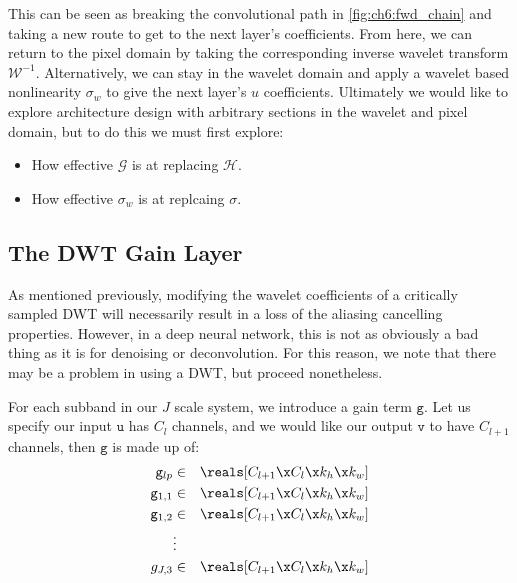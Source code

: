 This can be seen as breaking the convolutional path in
\autoref{fig:ch6:fwd_chain} and taking a new route to get to the next layer's
coefficients. From here, we can return to the pixel domain by taking the
corresponding inverse wavelet transform $\mathcal{W}^{-1}$. Alternatively, we
can stay in the wavelet domain and apply a wavelet based nonlinearity $\sigma_w$
to give the next layer's $u$ coefficients. Ultimately we would like to explore
architecture design with arbitrary sections in the wavelet and pixel domain, but
to do this we must first explore: 
\begin{itemize}
  \item How effective $\mathcal{G}$ is at replacing $\mathcal{H}$.
  \item How effective $\sigma_w$ is at replcaing $\sigma$.
\end{itemize}





\subsection{The DWT Gain Layer}
As mentioned previously, modifying the wavelet coefficients of a critically
sampled DWT will necessarily result in a loss of the aliasing cancelling
properties. However, in a deep neural network, this is not as obviously a bad
thing as it is for denoising or deconvolution. For this reason, we note that
there may be a problem in using a DWT, but proceed nonetheless.

For each subband in our $J$ scale system, we introduce a gain term $\mathtt{g}$. Let us specify our
input $\mathtt{u}$ has $C_l$ channels, and we would like our output $\mathtt{v}$
to have $C_{l+1}$ channels, then $\mathtt{g}$ is made up of:
\begin{eqnarray}
  \mathtt{g}_{lp} &\in& \reals[C_{l+1}\x C_l\x k_h\x k_w] \label{eq:ch6:glp} \\
  \mathtt{g}_{1,1} &\in& \reals[C_{l+1}\x C_l\x k_h\x k_w] \\
  \mathtt{g}_{1,2} &\in& \reals[C_{l+1}\x C_l\x k_h\x k_w] \\
      & \vdots &\\
  g_{J,3} &\in& \reals[C_{l+1}\x C_l\x k_h\x k_w]  \label{eq:ch6:gj3}
\end{eqnarray}
 

